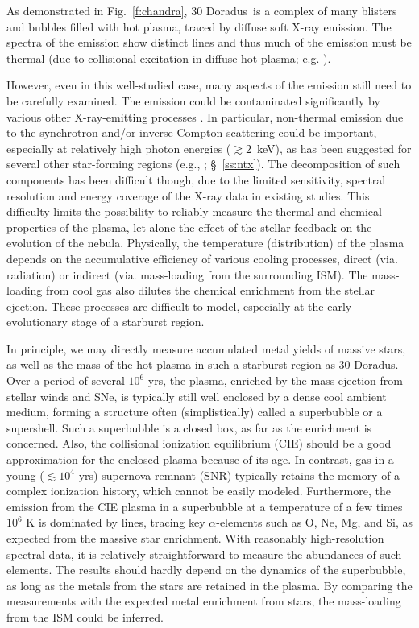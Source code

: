 \documentclass[usenatbib]{mnras}
\def\xs{30 Doradus}
\begin{document}
As demonstrated in Fig.~\ref{f:chandra}, \xs\ is a complex of many blisters and bubbles filled with hot plasma, traced by diffuse soft X-ray emission. The spectra of the emission show distinct lines and thus much of the emission must be thermal (due to collisional excitation in diffuse hot plasma; e.g. \citealt{Townsley1}). 

However, even in this well-studied case, many aspects of the emission still need to be carefully examined. The emission could be contaminated significantly by various other X-ray-emitting processes \citep[e.g.,][]{Persic2002,Liu2012,Zhang2014}. 
In particular, non-thermal emission due to the synchrotron and/or inverse-Compton scattering could be important, especially at relatively high photon energies ($\gtrsim 2$~keV), as has been suggested for several other star-forming regions (e.g., \citealt{Ezoe}; \S~\ref{ss:ntx}). The decomposition of such components has been difficult though, due to the limited sensitivity, spectral resolution and energy coverage of the X-ray data in existing studies. This difficulty limits the possibility to reliably measure the thermal and chemical properties of the plasma, let alone the effect of the stellar feedback on the evolution of the nebula.
Physically, the temperature (distribution) of the plasma depends on the accumulative efficiency of various cooling processes, direct (via. radiation) or indirect (via. mass-loading from the surrounding ISM). The mass-loading from cool gas also dilutes the chemical enrichment from the stellar ejection. These processes are difficult to model, especially at the early evolutionary stage of a starburst region. 

In principle, we may directly measure accumulated metal yields of massive stars, as well as the mass of the hot plasma in such a starburst region as \xs. Over a period of several $10^6$ yrs, the plasma, enriched by the mass ejection from stellar winds and SNe, is typically still well enclosed by a dense cool ambient medium, forming a structure often (simplistically) called a superbubble or a supershell. Such a superbubble is a closed box, as far as the enrichment is concerned. Also, the collisional ionization equilibrium (CIE) should be a good approximation for the enclosed plasma because of its age. In contrast, gas in a young ($\lesssim 10^4$ yrs) supernova remnant (SNR) typically retains the memory of a complex ionization history, which cannot be easily modeled. Furthermore, the emission from the CIE plasma in a superbubble at a temperature of a few times $10^6$ K is dominated by lines, tracing key $\alpha$-elements such as O, Ne, Mg, and Si, as expected from the massive star enrichment. With reasonably high-resolution spectral data, it is relatively straightforward to measure the abundances of such elements. The results should hardly depend on the dynamics of the superbubble, as long as the metals from the stars are retained in the plasma. By comparing the measurements with the expected metal enrichment from stars, the mass-loading from the ISM could be inferred. 
\end{document}
